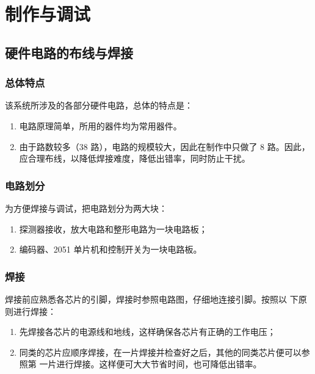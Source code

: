 \chapter{制作与调试}

\section{硬件电路的布线与焊接}

\subsection{总体特点}

该系统所涉及的各部分硬件电路，总体的特点是：

\begin{enumerate}
  \item 电路原理简单，所用的器件均为常用器件。
  \item 由于路数较多（38 路），电路的规模较大，因此在制作中只做了 8 路。因此，
  应合理布线，以降低焊接难度，降低出错率，同时防止干扰。
\end{enumerate}

\subsection{电路划分}

为方便焊接与调试，把电路划分为两大块：

\begin{enumerate}
  \item 探测器接收，放大电路和整形电路为一块电路板；
  \item 编码器、2051 单片机和控制开关为一块电路板。
\end{enumerate}

\subsection{焊接}

焊接前应熟悉各芯片的引脚，焊接时参照电路图，仔细地连接引脚。按照以
下原则进行焊接：

\begin{enumerate}
  \item 先焊接各芯片的电源线和地线，这样确保各芯片有正确的工作电压；
  \item 同类的芯片应顺序焊接，在一片焊接并检查好之后，其他的同类芯片便可以参照第
  一片进行焊接。这样便可大大节省时间，也可降低出错率。
\end{enumerate}

